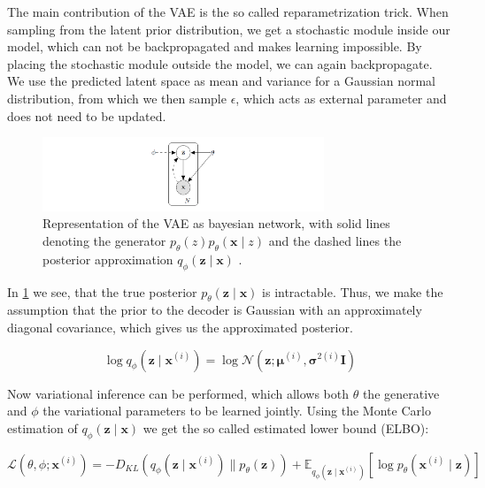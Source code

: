 The main contribution of the VAE is the so called reparametrization trick. When sampling from the latent prior distribution, we get a stochastic module inside our model, which can not be backpropagated and makes learning impossible. By placing the stochastic module outside the model, we can again backpropagate. We use the predicted latent space as mean and variance for a Gaussian normal distribution, from which we then sample $\epsilon$, which acts as external parameter and does not need to be updated.

\begin{figure}[h]
    \centering
    \includegraphics[width=0.75\textwidth]{data/images/repaTrick.png}
    \caption{Representation of the VAE as bayesian network, with solid lines denoting the generator $p_{{\theta}}(z)p_{{\theta}}(\mathbf{x} \mid z)$ and the dashed lines the posterior approximation $q_{\phi}(\mathbf{z} \mid \mathbf{x})$ \cite{kingma_auto-encoding_2014}.}
    \label{fig:varinference}
\end{figure}

In \ref{fig:varinference} we see, that the true posterior $p_{{\theta}}(\mathbf{z} \mid \mathbf{x})$ is intractable. Thus, we make the assumption that the prior to the decoder is Gaussian with an approximately diagonal covariance, which gives us the approximated posterior.

\begin{equation}
    \log q_{\phi}\left(\mathbf{z} \mid \mathbf{x}^{(i)}\right)=\log \mathcal{N}\left(\mathbf{z} ; \boldsymbol{\mu}^{(i)}, \boldsymbol{\sigma}^{2(i)} \mathbf{I}\right)
\end{equation}
    
Now variational inference can be performed, which allows both $\theta$ the generative and $\phi$ the variational parameters to be learned jointly. Using the Monte Carlo estimation of $q_{\phi}(\mathbf{z} \mid \mathbf{x})$ we get the so called estimated lower bound (ELBO):

\begin{equation}
    \mathcal{L}\left({\theta}, {\phi} ; \mathbf{x}^{(i)}\right)=-D_{K L}\left(q_{{\phi}}\left(\mathbf{z} \mid \mathbf{x}^{(i)}\right) \| p_{{\theta}}(\mathbf{z})\right)+\mathbb{E}_{q_{\phi}\left(\mathbf{z} \mid \mathbf{x}^{(i)}\right)}\left[\log p_{{\theta}}\left(\mathbf{x}^{(i)} \mid \mathbf{z}\right)\right]
    \label{eq3:elbo}
\end{equation}

